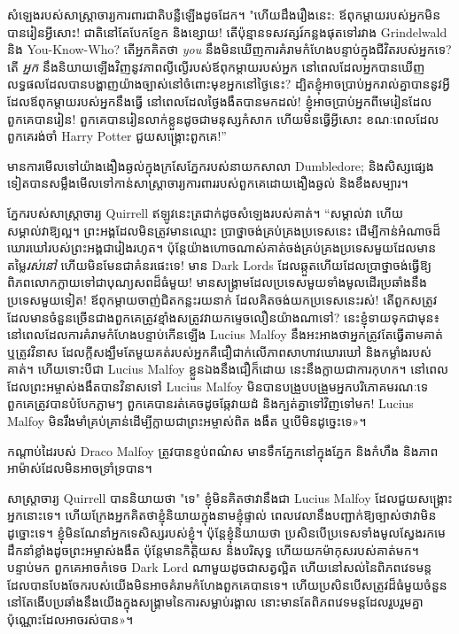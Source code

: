 {សំឡេងរបស់សាស្ត្រាចារ្យការពារជាតិបន្លឺឡើងដូចដែក។ "ហើយដឹងរឿងនេះ: ឪពុកម្តាយរបស់អ្នកមិនបានរៀនអ្វីសោះ! ជាតិ​នៅ​តែ​បែក​ខ្ញែក និង​ខ្សោយ! តើប៉ុន្មានទសវត្សរ៍កន្លងផុតទៅរវាង Grindelwald និង You-Know-Who? តើអ្នកគិតថា \emph{you} នឹងមិនឃើញការគំរាមកំហែងបន្ទាប់ក្នុងជីវិតរបស់អ្នកទេ? តើ \emph{អ្នក} នឹងនិយាយឡើងវិញនូវភាពល្ងីល្ងើរបស់ឪពុកម្តាយរបស់អ្នក នៅពេលដែលអ្នកបានឃើញលទ្ធផលដែលបានបង្ហាញយ៉ាងច្បាស់នៅចំពោះមុខអ្នកនៅថ្ងៃនេះ? ដ្បិត​ខ្ញុំ​អាច​ប្រាប់​អ្នក​រាល់​គ្នា​បាន​នូវ​អ្វី​ដែល​ឪពុក​ម្តាយ​របស់​អ្នក​នឹង​ធ្វើ នៅ​ពេល​ដែល​ថ្ងៃ​ងងឹត​បាន​មក​ដល់! ខ្ញុំអាចប្រាប់អ្នកពីមេរៀនដែលពួកគេបានរៀន! ពួកគេបានរៀនលាក់ខ្លួនដូចជាមនុស្សកំសាក ហើយមិនធ្វើអ្វីសោះ ខណៈពេលដែលពួកគេរង់ចាំ Harry Potter ជួយសង្គ្រោះពួកគេ!”

មាន​ការ​មើល​ទៅ​យ៉ាង​ងឿង​ឆ្ងល់​ក្នុង​ក្រសែ​ភ្នែក​របស់​នាយក​សាលា Dumbledore; និងសិស្សផ្សេងទៀតបានសម្លឹងមើលទៅកាន់សាស្រ្តាចារ្យការពាររបស់ពួកគេដោយងឿងឆ្ងល់ និងខឹងសម្បារ។

ភ្នែករបស់សាស្រ្តាចារ្យ Quirrell ឥឡូវនេះត្រជាក់ដូចសំឡេងរបស់គាត់។ “សម្គាល់វា ហើយសម្គាល់វាឱ្យល្អ។ ព្រះអង្គ​ដែល​មិន​ត្រូវ​មាន​ឈ្មោះ ប្រាថ្នា​ចង់​គ្រប់​គ្រង​ប្រទេស​នេះ ដើម្បី​កាន់​អំណាច​ដ៏​ឃោរឃៅ​របស់​ព្រះអង្គ​ជា​រៀង​រហូត។ ប៉ុន្តែយ៉ាងហោចណាស់គាត់ចង់គ្រប់គ្រងប្រទេសមួយដែលមានតម្លៃ\emph{រស់នៅ} ហើយមិនមែនជាគំនរផេះទេ! មាន​ Dark Lords ដែល​ឆ្កួត​ហើយ​ដែល​ប្រាថ្នា​ចង់​ធ្វើ​ឱ្យ​ពិភពលោក​ក្លាយ​ទៅ​ជា​បុណ្យ​សព​ដ៏​ធំ​មួយ​! មាន​សង្គ្រាម​ដែល​ប្រទេស​មួយ​ទាំងមូល​ដើរ​ប្រឆាំង​នឹង​ប្រទេស​មួយ​ទៀត! ឪពុក​ម្តាយ​ចាញ់​ជិត​កន្លះ​រយ​នាក់ ដែល​គិត​ចង់​យក​ប្រទេស​នេះ​រស់! តើ​ពួក​សត្រូវ​ដែល​មាន​ចំនួន​ច្រើន​ជាង​ពួក​គេ​ត្រូវ​ខ្មាំង​សត្រូវ​វាយ​កម្ទេច​លឿន​យ៉ាង​ណា​ទៅ? នេះខ្ញុំទាយទុកជាមុន៖ នៅពេលដែលការគំរាមកំហែងបន្ទាប់កើនឡើង Lucius Malfoy នឹងអះអាងថាអ្នកត្រូវតែធ្វើតាមគាត់ ឬត្រូវវិនាស ដែលក្តីសង្ឃឹមតែមួយគត់របស់អ្នកគឺជឿជាក់លើភាពសាហាវឃោរឃៅ និងកម្លាំងរបស់គាត់។ ហើយទោះបីជា Lucius Malfoy ខ្លួនឯងនឹងជឿក៏ដោយ នេះនឹងក្លាយជាការកុហក។ នៅពេលដែលព្រះអម្ចាស់ងងឹតបានវិនាសទៅ Lucius Malfoy មិនបានបង្រួបបង្រួមអ្នកបរិភោគមរណៈទេ ពួកគេត្រូវបានបំបែកភ្លាមៗ ពួកគេបានរត់គេចដូចឆ្កែវាយដំ និងក្បត់គ្នាទៅវិញទៅមក! Lucius Malfoy មិនរឹងមាំគ្រប់គ្រាន់ដើម្បីក្លាយជាព្រះអម្ចាស់ពិត ងងឹត ឬបើមិនដូច្នេះទេ»។

កណ្ដាប់ដៃរបស់ Draco Malfoy ត្រូវបានខ្ទប់ពណ៌ស មានទឹកភ្នែកនៅក្នុងភ្នែក និងកំហឹង និងភាពអាម៉ាស់ដែលមិនអាចទ្រាំទ្របាន។

សាស្រ្តាចារ្យ Quirrell បាននិយាយថា "ទេ" ខ្ញុំមិនគិតថាវានឹងជា Lucius Malfoy ដែលជួយសង្គ្រោះអ្នកនោះទេ។ ហើយ​ក្រែង​អ្នក​គិត​ថា​ខ្ញុំ​និយាយ​ក្នុង​នាម​ខ្ញុំ​ផ្ទាល់ ពេលវេលា​នឹង​បញ្ជាក់​ឱ្យ​ច្បាស់​ថា​វា​មិន​ដូច្នោះ​ទេ​។ ខ្ញុំមិនណែនាំអ្នកទេសិស្សរបស់ខ្ញុំ។ ប៉ុន្តែខ្ញុំនិយាយថា ប្រសិនបើប្រទេសទាំងមូលស្វែងរកមេដឹកនាំខ្លាំងដូចព្រះអម្ចាស់ងងឹត ប៉ុន្តែមានកិត្តិយស និងបរិសុទ្ធ ហើយយកម៉ាកុសរបស់គាត់មក។ បន្ទាប់មក ពួកគេអាចកំទេច Dark Lord ណាមួយដូចជាសត្វល្អិត ហើយនៅសល់នៃពិភពវេទមន្តដែលបានបែងចែករបស់យើងមិនអាចគំរាមកំហែងពួកគេបានទេ។ ហើយ​ប្រសិនបើ​សត្រូវ​ដ៏​ធំ​មួយ​ចំនួន​នៅ​តែ​ងើប​ប្រឆាំង​នឹង​យើង​ក្នុង​សង្គ្រាម​នៃ​ការ​សម្លាប់​រង្គាល នោះ​មាន​តែ​ពិភព​វេទមន្ត​ដែល​រួបរួម​គ្នា​ប៉ុណ្ណោះ​ដែល​អាច​រស់​បាន»។

}
